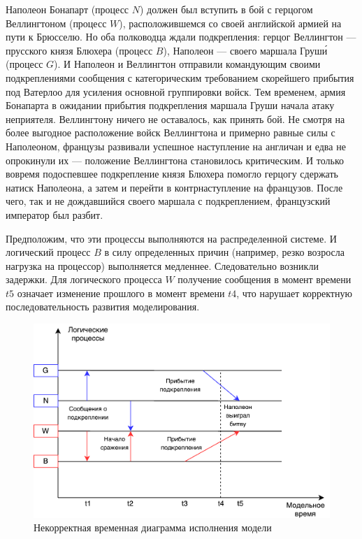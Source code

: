 Наполеон Бонапарт (процесс $N$) должен был вступить в бой с герцогом Веллингтоном (процесс $W$), расположившемся со своей английской армией на пути к Брюсселю. Но оба полководца ждали подкрепления: герцог Веллингтон --- прусского князя Блюхера (процесс $B$), Наполеон --- своего маршала Груш\'и (процесс $G$). И Наполеон и Веллингтон отправили командующим своими подкреплениями сообщения с категорическим требованием скорейшего прибытия под Ватерлоо для усиления основной группировки войск. Тем временем, армия Бонапарта в ожидании прибытия подкрепления маршала Груши начала атаку неприятеля. Веллингтону ничего не оставалось, как принять бой. Не смотря на более выгодное расположение войск Веллингтона и примерно равные силы с Наполеоном, французы развивали успешное наступление на англичан и едва не опрокинули их --- положение Веллингтона становилось критическим. И только вовремя подоспевшее подкрепление князя Блюхера помогло герцогу сдержать натиск Наполеона, а затем и перейти в контрнаступление на французов. После чего, так и не дождавшийся своего маршала с подкреплением, французский император был разбит.

Предположим, что эти процессы выполняются на распределенной системе. И логический процесс $B$ в силу определенных причин (например, резко возросла нагрузка на процессор) выполняется медленнее. Следовательно возникли задержки. Для логического процесса $W$ получение сообщения в момент времени $t5$ означает изменение прошлого в момент времени $t4$, что нарушает корректную последовательность развития моделирования.

\begin{figure}[H]
\centering
\includegraphics[scale=1]{графика/unwaterloo.pdf}
\caption{Некорректная временная диаграмма исполнения модели}
\end{figure}

